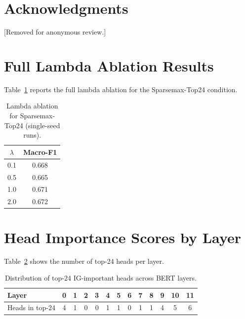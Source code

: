 \documentclass{article}
\begin{document}
\section*{Acknowledgments}

[Removed for anonymous review.]




\appendix
\section{Full Lambda Ablation Results}
\label{app:lambda}

Table~\ref{tab:lambda} reports the full lambda ablation for the
Sparsemax-Top24 condition.

\begin{table}[h]
\centering
\caption{Lambda ablation for Sparsemax-Top24 (single-seed runs).}
\label{tab:lambda}
\small
\begin{tabular}{@{}cc@{}}
\toprule
$\lambda$ & Macro-F1 \\
\midrule
0.1 & 0.668 \\
0.5 & 0.665 \\
1.0 & 0.671 \\
2.0 & 0.672 \\
\bottomrule
\end{tabular}
\end{table}

\section{Head Importance Scores by Layer}
\label{app:heads}

Table~\ref{tab:heads_by_layer} shows the number of top-24 heads per layer.

\begin{table}[h]
\centering
\caption{Distribution of top-24 IG-important heads across BERT layers.}
\label{tab:heads_by_layer}
\small
\begin{tabular}{@{}lcccccccccccc@{}}
\toprule
Layer & 0 & 1 & 2 & 3 & 4 & 5 & 6 & 7 & 8 & 9 & 10 & 11 \\
\midrule
Heads in top-24 & 4 & 1 & 0 & 0 & 1 & 1 & 0 & 1 & 1 & 4 & 5 & 6 \\
\bottomrule
\end{tabular}
\end{table}
\end{document}

